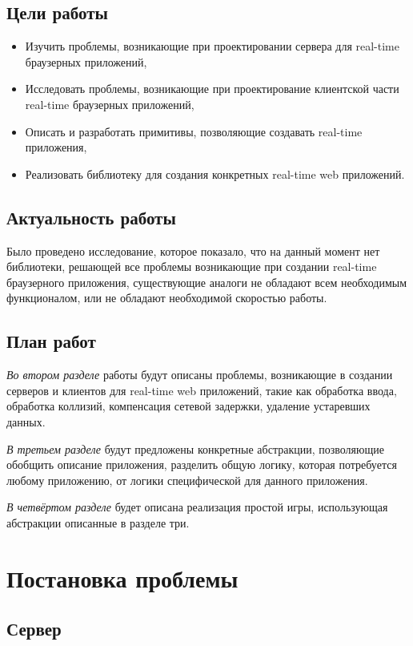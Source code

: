 \documentclass[a4paper,14pt, openany]{book}
\begin{document}
\section{Цели работы}

\begin{itemize}
  \item Изучить проблемы, возникающие при проектировании сервера для real-time браузерных приложений,
  \item Исследовать проблемы, возникающие при проектирование клиентской части real-time браузерных приложений,
  \item Описать и разработать примитивы, позволяющие создавать real-time приложения,
  \item Реализовать библиотеку для создания конкретных real-time web приложений.
\end{itemize}

\section{Актуальность работы}

Было проведено исследование, которое показало, что на данный момент нет библиотеки, решающей все проблемы возникающие при создании real-time браузерного приложения, существующие аналоги не обладают всем необходимым функционалом, или не обладают необходимой скоростью работы.

\section{План работ}
\emph{Во втором разделе} работы будут описаны проблемы, возникающие в создании серверов и клиентов для real-time web приложений, такие как обработка ввода, обработка коллизий, компенсация сетевой задержки, удаление устаревших данных. 

\emph{В третьем разделе} будут предложены конкретные абстракции, позволяющие обобщить описание приложения, разделить общую логику, которая потребуется любому приложению, от логики специфической для данного приложения. 

\emph{В четвёртом разделе} будет описана реализация простой игры, использующая абстракции описанные в разделе три.


\chapter{Постановка проблемы}

\section{Сервер}
\end{document}
